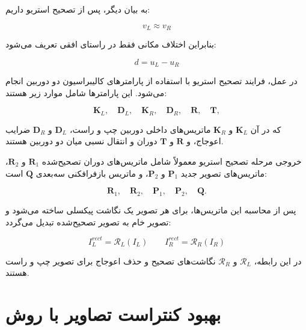 به بیان دیگر، پس از تصحیح استریو داریم:

\begin{equation}
	v_L \approx v_R
	\label{eq:rectified_same_row}
\end{equation}

بنابراین اختلاف مکانی فقط در راستای افقی تعریف می‌شود:

\begin{equation}
	d = u_L - u_R
	\label{eq:disparity_definition}
\end{equation}

در عمل، فرایند تصحیح استریو با استفاده از پارامترهای کالیبراسیون دو دوربین انجام می‌شود. این پارامترها شامل موارد زیر هستند:

\begin{equation}
	\mathbf{K}_L,\quad
	\mathbf{D}_L,\quad
	\mathbf{K}_R,\quad
	\mathbf{D}_R,\quad
	\mathbf{R},\quad
	\mathbf{T},
\end{equation}

که در آن \(\mathbf{K}_L\) و \(\mathbf{K}_R\) ماتریس‌های داخلی دوربین چپ و راست، \(\mathbf{D}_L\) و \(\mathbf{D}_R\) ضرایب اعوجاج، و \(\mathbf{R}\) و \(\mathbf{T}\) دوران و انتقال نسبی میان دو دوربین هستند.

خروجی مرحله تصحیح استریو معمولاً شامل ماتریس‌های دوران تصحیح‌شده \(\mathbf{R}_1\) و \(\mathbf{R}_2\)، ماتریس‌های تصویر جدید \(\mathbf{P}_1\) و \(\mathbf{P}_2\)، و ماتریس بازفرافکنی سه‌بعدی \(\mathbf{Q}\) است:

\begin{equation}
	\mathbf{R}_1,\quad
	\mathbf{R}_2,\quad
	\mathbf{P}_1,\quad
	\mathbf{P}_2,\quad
	\mathbf{Q}.
\end{equation}

پس از محاسبه این ماتریس‌ها، برای هر تصویر یک نگاشت پیکسلی ساخته می‌شود و تصویر خام به تصویر تصحیح‌شده تبدیل می‌گردد:

\begin{equation}
	I_L^{rect} = \mathcal{R}_L(I_L)
	\qquad
	I_R^{rect} = \mathcal{R}_R(I_R)
	\label{eq:rectified_images}
\end{equation}

در این رابطه، \(\mathcal{R}_L\) و \(\mathcal{R}_R\) نگاشت‌های تصحیح و حذف اعوجاج برای تصویر چپ و راست هستند.

\section{بهبود کنتراست تصاویر با روش }

